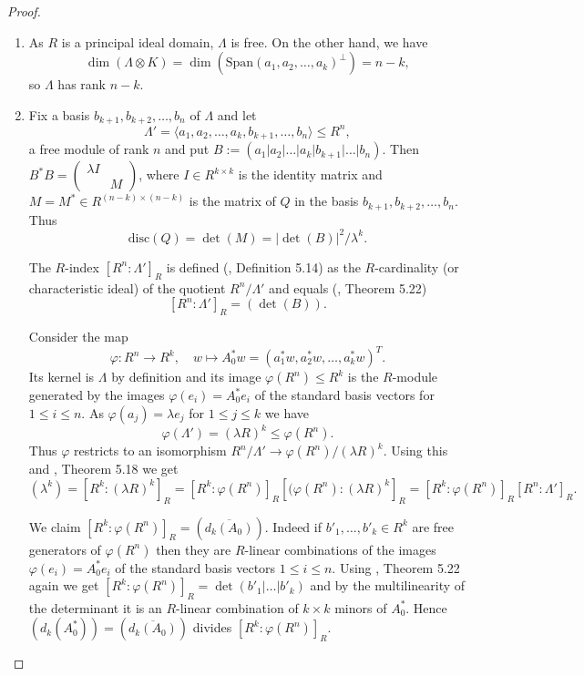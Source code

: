 \documentclass[11pt]{amsart}
\newcommand{\disc}{\mathrm{disc}}
\theoremstyle{definition}
\theoremstyle{remark}
\begin{document}
\begin{proof}~
\begin{enumerate}
\item As $R$ is a principal ideal domain, $\Lambda$ is free. On the other hand, we have
\[\dim(\Lambda\otimes K)=\dim(\mathrm{Span}(a_1,a_2,\dots,a_k)^\perp)=n-k,\]
so $\Lambda$ has rank $n-k$.
\item Fix a basis $b_{k+1},b_{k+2},\dots,b_n$ of $\Lambda$ and let
\[\Lambda'=\langle a_1,a_2,\dots,a_k,b_{k+1},\dots,b_n\rangle\leq R^n,\]
a free module of rank $n$ and put $B:=(a_1|a_2|\dots|a_k|b_{k+1}|\dots |b_n)$. Then $B^*B=\left(\begin{smallmatrix} \lambda I & \\ & M\end{smallmatrix}\right)$, where $I\in R^{k \times k}$ is the identity matrix and $M=M^*\in R^{(n-k)\times (n-k)}$ is the matrix of $Q$ in the basis $b_{k+1},b_{k+2},\dots, b_n$. Thus
\begin{equation}\label{LambdaDisc}
\disc(Q)=\det(M)=|\det(B)|^2/\lambda^k.
\end{equation}

The $R$-index $[R^n:\Lambda']_R$ is defined (\cite{Conrad}, Definition 5.14) as the $R$-cardinality (or characteristic ideal) of the quotient $R^n/\Lambda'$ and equals (\cite{Conrad}, Theorem 5.22)
\[[R^n:\Lambda']_R=(\det(B)).
\]

Consider the map
\[\varphi:R^n\to R^k, \quad w\mapsto A_0^*w=(a_1^*w,a_2^*w,\dots,a_k^*w)^T.\]
Its kernel is $\Lambda$ by definition and its image $\varphi(R^n)\leq R^k$ is the $R$-module generated by the images $\varphi(e_i)=A_0^*e_i$ of the standard basis vectors for $1\leq i\leq n$. As $\varphi(a_j)=\lambda e_j$ for $1\leq j\leq k$ we have
\[\varphi(\Lambda')=(\lambda R)^k\leq\varphi(R^n).\]
Thus $\varphi$ restricts to an isomorphism $R^n/\Lambda'\to\varphi(R^n)/(\lambda R)^k$. Using this and \cite{Conrad}, Theorem 5.18 we get
\begin{equation}\label{Rindex}
(\lambda^k)=[R^k:(\lambda R)^k]_R=[R^k:\varphi(R^n)]_R[(\varphi(R^n):(\lambda R)^k]_R=[R^k:\varphi(R^n)]_R[R^n:\Lambda']_R.
\end{equation}

We claim $[R^k:\varphi(R^n)]_R=(\overline{d_k(A_0)})$. Indeed if $b'_1,\dots, b'_k\in R^k$ are free generators of $\varphi(R^n)$ then they are $R$-linear combinations of the images $\varphi(e_i)=A_0^*e_i$ of the standard basis vectors $1\leq i\leq n$. Using \cite{Conrad}, Theorem 5.22 again we get $[R^k:\varphi(R^n)]_R=\det(b'_1|\dots|b'_k)$ and by the multilinearity of the determinant it is an $R$-linear combination of $k\times k$ minors of $A_0^*$. Hence $(d_k(A_0^*))=(\overline{d_k(A_0)})$ divides 
$[R^k:\varphi(R^n)]_R$.


\end{enumerate}
\end{proof}
\end{document}
